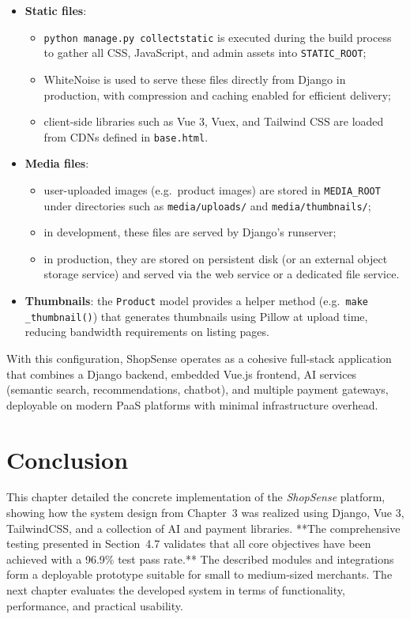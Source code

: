 \begin{itemize}
  \item \textbf{Static files}:
  \begin{itemize}
    \item \texttt{python manage.py collectstatic} is executed during the build process to gather all CSS, JavaScript, and admin assets into \texttt{STATIC\_ROOT};
    \item WhiteNoise is used to serve these files directly from Django in production, with compression and caching enabled for efficient delivery;
    \item client-side libraries such as Vue 3, Vuex, and Tailwind CSS are loaded from CDNs defined in \texttt{base.html}.
  \end{itemize}
  \item \textbf{Media files}:
  \begin{itemize}
    \item user-uploaded images (e.g.\ product images) are stored in \texttt{MEDIA\_ROOT} under directories such as \texttt{media/uploads/} and \texttt{media/thumbnails/};
    \item in development, these files are served by Django’s runserver;
    \item in production, they are stored on persistent disk (or an external object storage service) and served via the web service or a dedicated file service.
  \end{itemize}
  \item \textbf{Thumbnails}: the \texttt{Product} model provides a helper method (e.g.\ \texttt{make\\\_thumbnail()}) that generates thumbnails using Pillow at upload time, reducing bandwidth requirements on listing pages.
\end{itemize}

With this configuration, ShopSense operates as a cohesive full-stack application that combines a Django backend, embedded Vue.js frontend, AI services (semantic search, recommendations, chatbot), and multiple payment gateways, deployable on modern PaaS platforms with minimal infrastructure overhead.



\section{Conclusion}
This chapter detailed the concrete implementation of the \textit{ShopSense} platform, showing how the system design from Chapter~3 was realized using Django, Vue 3, TailwindCSS, and a collection of AI and payment libraries. **The comprehensive testing presented in Section~4.7 validates that all core objectives have been achieved with a 96.9\% test pass rate.** The described modules and integrations form a deployable prototype suitable for small to medium-sized merchants. The next chapter evaluates the developed system in terms of functionality, performance, and practical usability.